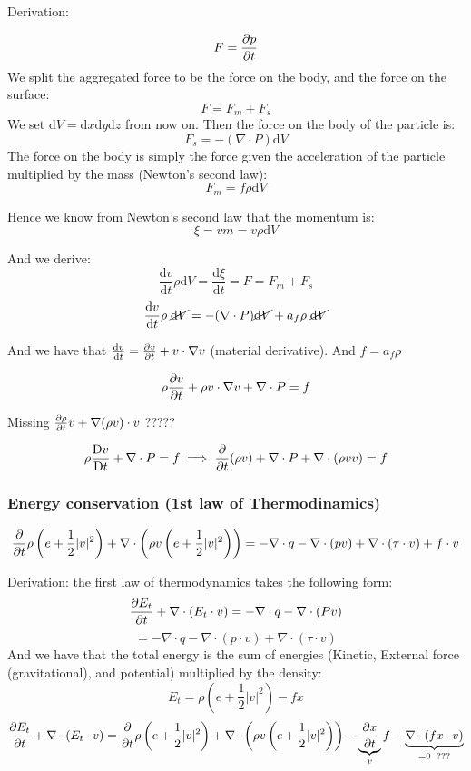 \documentclass[main.tex]{subfiles}
\begin{document}
Derivation:

$$F = \frac{\partial p}{\partial t}$$
We split the aggregated force to be the force on the body, and the force on the surface:
$$F = F_m + F_s$$
We set $\text{d}V = \text{d}x\text{d}y\text{d}z$ from now on. Then the force on the body of the particle is: 
$$F_s = -(\nabla\cdot P)\text{d}V$$
The force on the body is simply the force given the acceleration of the particle multiplied by the mass (Newton's second law):
$$F_m = f\rho \text{d}V$$

Hence we know from Newton's second law that the momentum is: 
$$\xi = v m = v \rho \text{d} V$$

And we derive:
$$\frac{\text{d} v}{\text{d} t}\rho \text{d}V = \frac{\text{d} \xi}{\text{d} t} = F = F_m + F_s$$
$$\frac{\text{d} v}{\text{d} t}\rho \; \cancel{\text{d}V} = -(\nabla\cdot P) \cancel{\text{d} V} + a_f\rho\; \cancel{\text{d}V}$$

And we have that $\frac{\text{d} v}{\text{d} t} = \frac{\partial v}{\partial t} + v \cdot\nabla v$ (material derivative). And $f = a_f\rho$

$$\rho \frac{\partial v}{\partial t} + \rho v\cdot \nabla v + \nabla \cdot P = f$$

Missing $\frac{\partial \rho}{\partial t} v + \nabla(\rho v)\cdot v$ ????? 

$$\rho\frac{\text{D} v}{\text{D} t} + \nabla\cdot P = f \implies \frac{\partial }{\partial t}(\rho v) + \nabla \cdot P + \nabla\cdot(\rho vv) = f$$

\subsubsection{Energy conservation (1st law of Thermodinamics)}

\begin{equation}
    \frac{\partial }{\partial t}\rho\left(e + \frac{1}{2}|v|^2\right) + \nabla\cdot \left(\rho v\left(e + \frac{1}{2}|v|^2\right)\right) = -\nabla\cdot q -\nabla\cdot (p v) + \nabla \cdot (\tau \cdot v) + f \cdot v
    \label{eq:thm1}
\end{equation}

Derivation:
the first law of thermodynamics takes the following form:
$$
\frac{\partial E_t}{\partial t} + \nabla\cdot(E_t\cdot v) = -\nabla\cdot q - \nabla\cdot(P v)$$
$$= -\nabla\cdot q -\nabla\cdot (p\cdot v) + \nabla \cdot (\tau \cdot v)$$
And we have that the total energy is the sum of energies (Kinetic, External force (gravitational), and potential) multiplied by the density:
$$E_t = \rho(e + \frac{1}{2}|v|^2) - f x$$
$$\frac{\partial E_t}{\partial t} + \nabla\cdot(E_t\cdot v) =\frac{\partial }{\partial t}\rho\left(e + \frac{1}{2}|v|^2\right) + \nabla\cdot\left(\rho v\left( e + \frac{1}{2}|v|^2\right)\right) - \underbrace{\frac{\partial x}{\partial t}}_{v} f - \underbrace{\nabla\cdot(fx\cdot v)}_{=0\;\; ???}$$
\end{document}
